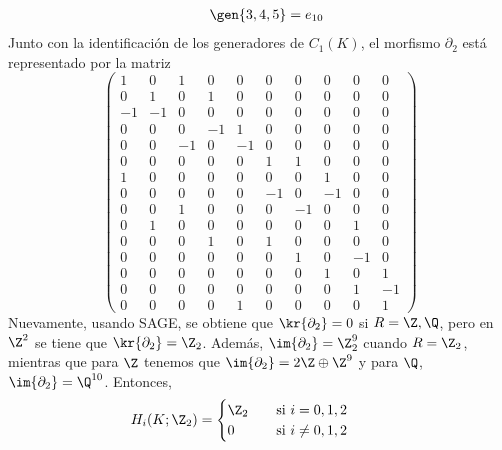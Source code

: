 \documentclass{article}
\begin{document}
\begin{enumerate}
\begin{equation*}
\begin{array}{lll}
            & \gen{3,4,5}=e_{10}
        \end{array}
    \end{equation*}
    Junto con la identificación de los generadores de $C_{1}(K)$, el morfismo $\partial_{2}$ está
    representado por la matriz
    \begin{equation*}
        \begin{pmatrix}
            1 & 0 & 1 & 0 & 0 & 0 & 0 & 0 & 0 & 0 \\
            0 & 1 & 0 & 1 & 0 & 0 & 0 & 0 & 0 & 0 \\
            -1 & -1 & 0 & 0 & 0 & 0 & 0 & 0 & 0 & 0 \\
            0 & 0 & 0 & -1 & 1 & 0 & 0 & 0 & 0 & 0 \\
            0 & 0 & -1 & 0 & -1 & 0 & 0 & 0 & 0 & 0 \\
            0 & 0 & 0 & 0 & 0 & 1 & 1 & 0 & 0 & 0 \\
            1 & 0 & 0 & 0 & 0 & 0 & 0 & 1 & 0 & 0 \\
            0 & 0 & 0 & 0 & 0 & -1 & 0 & -1 & 0 & 0 \\
            0 & 0 & 1 & 0 & 0 & 0 & -1 & 0 & 0 & 0 \\
            0 & 1 & 0 & 0 & 0 & 0 & 0 & 0 & 1 & 0 \\
            0 & 0 & 0 & 1 & 0 & 1 & 0 & 0 & 0 & 0 \\
            0 & 0 & 0 & 0 & 0 & 0 & 1 & 0 & -1 & 0 \\
            0 & 0 & 0 & 0 & 0 & 0 & 0 & 1 & 0 & 1 \\
            0 & 0 & 0 & 0 & 0 & 0 & 0 & 0 & 1 & -1 \\
            0 & 0 & 0 & 0 & 1 & 0 & 0 & 0 & 0 & 1
        \end{pmatrix}
    \end{equation*}
    Nuevamente, usando SAGE, se obtiene que $\kr{\partial_{2}}=0$ si $R=\Z,\Q$, pero en $\Z^{2}$ 
    se tiene que $\kr{\partial_{2}}=\Z_{2}$. Además, $\im{\partial_{2}}=\Z_{2}^{9}$ cuando 
    $R=\Z_{2}$, mientras que para $\Z$ tenemos que $\im{\partial_{2}}=2\Z\oplus\Z^{9}$ y para 
    $\Q$, $\im{\partial_{2}}=\Q^{10}$. Entonces,
    \begin{equation*}
        H_{i}(K;\Z_{2})=\begin{cases}
            \Z_{2} &\quad\text{si }i=0,1,2 \\
            0 &\quad\text{si }i\neq0,1,2
        \end{cases}
        \hspace{1cm}

\end{equation*}
\end{enumerate}
\end{document}
